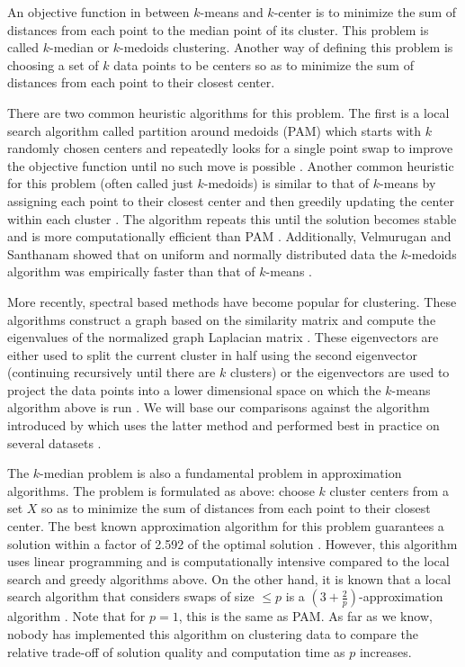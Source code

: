 \documentclass{article}
\begin{document}
An objective function in between $k$-means and $k$-center is to minimize the sum of distances from each point to the median point of its cluster. This problem is called $k$-median or $k$-medoids clustering. Another way of defining this problem is choosing a set of $k$ data points to be centers so as to minimize the sum of distances from each point to their closest center. 

There are two common heuristic algorithms for this problem. The first is a local search algorithm called partition around medoids (PAM) which starts with $k$ randomly chosen centers and repeatedly looks for a single point swap to improve the objective function until no such move is possible \cite{ESL}. 
Another common heuristic for this problem (often called just $k$-medoids) is similar to that of $k$-means by assigning each point to their closest center and then greedily updating the center within each cluster \cite{Park}. The algorithm repeats this until the solution becomes stable and is more computationally efficient than PAM \cite{Park}. Additionally, Velmurugan and Santhanam showed that on uniform and normally distributed data the $k$-medoids algorithm was empirically faster than that of $k$-means \cite{Velmurugan}. 

More recently, spectral based methods have become popular for clustering. These algorithms construct a graph based on the similarity matrix and compute the eigenvalues of the normalized graph Laplacian matrix \cite{Luxburg}. These eigenvectors are either used to split the current cluster in half using the second eigenvector (continuing recursively until there are $k$ clusters) or the eigenvectors are used to project the data points into a lower dimensional space on which the $k$-means algorithm above is run \cite{Verma}. We will base our comparisons against the algorithm introduced by \cite{Meila} which uses the latter method and performed best in practice on several datasets \cite{Verma}.

The $k$-median problem is also a fundamental problem in approximation algorithms. The problem is formulated as above: choose $k$ cluster centers from a set $X$ so as to minimize the sum of distances from each point to their closest center. The best known approximation algorithm for this problem guarantees a solution within a factor of 2.592 of the optimal solution \cite{Wu}. However, this algorithm uses linear programming and is computationally intensive compared to the local search and greedy algorithms above. On the other hand, it is known that a local search algorithm that considers swaps of size $\leq p$ is a $(3 + \frac{2}{p})$-approximation algorithm \cite{Arya}. Note that for $p=1$, this is the same as PAM. As far as we know, nobody has implemented this algorithm on clustering data to compare the relative trade-off of solution quality and computation time as $p$ increases.  
\end{document}
